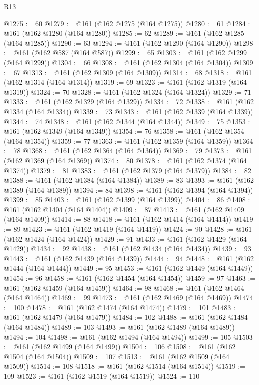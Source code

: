 \begin{lexlean}{R13}
\begin{coremodule}
{{{{{{{{{{{{{{{{{{{{{{{{{{{{{{{{{{{{{{{{{{{{{{{{{{{{{{{{{{{{{{{{{{{{{{{{{{{{{{{{{{{{{{{{{{{{{{{{{{{{{{{{{{@1275 := 60
@1279 := @161 (@162 @1275 (@164 @1275))
@1280 := 61
@1284 := @161 (@162 @1280 (@164 @1280))
@1285 := 62
@1289 := @161 (@162 @1285 (@164 @1285))
@1290 := 63
@1294 := @161 (@162 @1290 (@164 @1290))
@1298 := @161 (@162 @587 (@164 @587))
@1299 := 65
@1303 := @161 (@162 @1299 (@164 @1299))
@1304 := 66
@1308 := @161 (@162 @1304 (@164 @1304))
@1309 := 67
@1313 := @161 (@162 @1309 (@164 @1309))
@1314 := 68
@1318 := @161 (@162 @1314 (@164 @1314))
@1319 := 69
@1323 := @161 (@162 @1319 (@164 @1319))
@1324 := 70
@1328 := @161 (@162 @1324 (@164 @1324))
@1329 := 71
@1333 := @161 (@162 @1329 (@164 @1329))
@1334 := 72
@1338 := @161 (@162 @1334 (@164 @1334))
@1339 := 73
@1343 := @161 (@162 @1339 (@164 @1339))
@1344 := 74
@1348 := @161 (@162 @1344 (@164 @1344))
@1349 := 75
@1353 := @161 (@162 @1349 (@164 @1349))
@1354 := 76
@1358 := @161 (@162 @1354 (@164 @1354))
@1359 := 77
@1363 := @161 (@162 @1359 (@164 @1359))
@1364 := 78
@1368 := @161 (@162 @1364 (@164 @1364))
@1369 := 79
@1373 := @161 (@162 @1369 (@164 @1369))
@1374 := 80
@1378 := @161 (@162 @1374 (@164 @1374))
@1379 := 81
@1383 := @161 (@162 @1379 (@164 @1379))
@1384 := 82
@1388 := @161 (@162 @1384 (@164 @1384))
@1389 := 83
@1393 := @161 (@162 @1389 (@164 @1389))
@1394 := 84
@1398 := @161 (@162 @1394 (@164 @1394))
@1399 := 85
@1403 := @161 (@162 @1399 (@164 @1399))
@1404 := 86
@1408 := @161 (@162 @1404 (@164 @1404))
@1409 := 87
@1413 := @161 (@162 @1409 (@164 @1409))
@1414 := 88
@1418 := @161 (@162 @1414 (@164 @1414))
@1419 := 89
@1423 := @161 (@162 @1419 (@164 @1419))
@1424 := 90
@1428 := @161 (@162 @1424 (@164 @1424))
@1429 := 91
@1433 := @161 (@162 @1429 (@164 @1429))
@1434 := 92
@1438 := @161 (@162 @1434 (@164 @1434))
@1439 := 93
@1443 := @161 (@162 @1439 (@164 @1439))
@1444 := 94
@1448 := @161 (@162 @1444 (@164 @1444))
@1449 := 95
@1453 := @161 (@162 @1449 (@164 @1449))
@1454 := 96
@1458 := @161 (@162 @1454 (@164 @1454))
@1459 := 97
@1463 := @161 (@162 @1459 (@164 @1459))
@1464 := 98
@1468 := @161 (@162 @1464 (@164 @1464))
@1469 := 99
@1473 := @161 (@162 @1469 (@164 @1469))
@1474 := 100
@1478 := @161 (@162 @1474 (@164 @1474))
@1479 := 101
@1483 := @161 (@162 @1479 (@164 @1479))
@1484 := 102
@1488 := @161 (@162 @1484 (@164 @1484))
@1489 := 103
@1493 := @161 (@162 @1489 (@164 @1489))
@1494 := 104
@1498 := @161 (@162 @1494 (@164 @1494))
@1499 := 105
@1503 := @161 (@162 @1499 (@164 @1499))
@1504 := 106
@1508 := @161 (@162 @1504 (@164 @1504))
@1509 := 107
@1513 := @161 (@162 @1509 (@164 @1509))
@1514 := 108
@1518 := @161 (@162 @1514 (@164 @1514))
@1519 := 109
@1523 := @161 (@162 @1519 (@164 @1519))
@1524 := 110
}}}}}}}}}}}}}}}}}}}}}}}}}}}}}}}}}}}}}}}}}}}}}}}}}}}}}}}}}}}}}}}}}}}}}}}}}}}}}}}}}}}}}}}}}}}}}}}}}}}}}}}}}}
\end{coremodule}
\end{lexlean}
